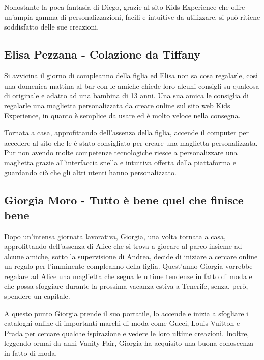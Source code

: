 \documentclass[12pt,italian,]{report}
\begin{document}
Nonostante la poca fantasia di Diego, grazie al sito Kids Experience che
offre un'ampia gamma di personalizzazioni, facili e intuitive da
utilizzare, si può ritiene soddisfatto delle sue creazioni.

\hypertarget{elisa-pezzana---colazione-da-tiffany}{%
\subsection{Elisa Pezzana - Colazione da
Tiffany}\label{elisa-pezzana---colazione-da-tiffany}}

Si avvicina il giorno di compleanno della figlia ed Elisa non sa cosa
regalarle, così una domenica mattina al bar con le amiche chiede loro
alcuni consigli su qualcosa di originale e adatto ad una bambina di 13
anni. Una sua amica le consiglia di regalarle una maglietta
personalizzata da creare online sul sito web Kids Experience, in quanto
è semplice da usare ed è molto veloce nella consegna.

Tornata a casa, approfittando dell'assenza della figlia, accende il computer per accedere al sito che le è stato consigliato per creare una maglietta personalizzata. Pur non avendo molte competenze tecnologiche riesce a personalizzare una maglietta grazie all'interfaccia snella e intuitiva
offerta dalla piattaforma e guardando ciò che gli altri utenti hanno personalizzato.

\hypertarget{giorgia-moro---tutto-bene-quel-che-finisce-bene}{%
\subsection{Giorgia Moro - Tutto è bene quel che finisce
bene}\label{giorgia-moro---tutto-bene-quel-che-finisce-bene}}

Dopo un'intensa giornata lavorativa, Giorgia, una volta tornata a casa,
approfittando dell'assenza di Alice che si trova a giocare al parco
insieme ad alcune amiche, sotto la supervisione di Andrea, decide di
iniziare a cercare online un regalo per l'imminente compleanno della
figlia. Quest'anno Giorgia vorrebbe regalare ad Alice una maglietta che
segua le ultime tendenze in fatto di moda e che possa sfoggiare durante
la prossima vacanza estiva a Tenerife, senza, però, spendere un
capitale.

A questo punto Giorgia prende il suo portatile, lo accende e inizia a
sfogliare i cataloghi online di importanti marchi di moda come Gucci,
Louis Vuitton e Prada per cercare qualche ispirazione e vedere le loro
ultime creazioni. Inoltre, leggendo ormai da anni Vanity Fair, Giorgia
ha acquisito una buona conoscenza in fatto di moda.
\end{document}
